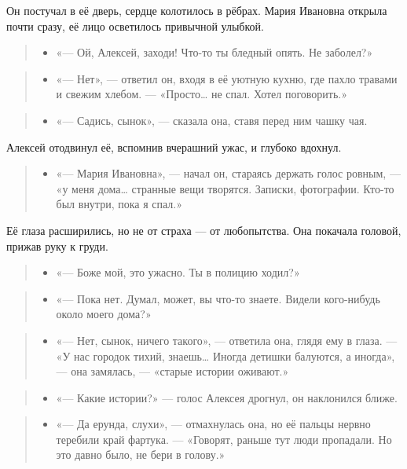 \documentclass[12pt,a4paper]{book}
\newenvironment{dialogue}{\begin{quote}\itshape\begin{itemize}\item[]}{\end{itemize}\end{quote}}
\begin{document}
Он постучал в её дверь, сердце колотилось в рёбрах. Мария Ивановна открыла почти сразу, её лицо осветилось привычной улыбкой.

\begin{dialogue}
«— Ой, Алексей, заходи! Что-то ты бледный опять. Не заболел?»
\end{dialogue}

\begin{dialogue}
«— Нет», — ответил он, входя в её уютную кухню, где пахло травами и свежим хлебом. — «Просто… не спал. Хотел поговорить.»
\end{dialogue}

\begin{dialogue}
«— Садись, сынок», — сказала она, ставя перед ним чашку чая.
\end{dialogue}

Алексей отодвинул её, вспомнив вчерашний ужас, и глубоко вдохнул.

\begin{dialogue}
«— Мария Ивановна», — начал он, стараясь держать голос ровным, — «у меня дома… странные вещи творятся. Записки, фотографии. Кто-то был внутри, пока я спал.»
\end{dialogue}

Её глаза расширились, но не от страха — от любопытства. Она покачала головой, прижав руку к груди.

\begin{dialogue}
«— Боже мой, это ужасно. Ты в полицию ходил?»
\end{dialogue}

\begin{dialogue}
«— Пока нет. Думал, может, вы что-то знаете. Видели кого-нибудь около моего дома?»
\end{dialogue}

\begin{dialogue}
«— Нет, сынок, ничего такого», — ответила она, глядя ему в глаза. — «У нас городок тихий, знаешь… Иногда детишки балуются, а иногда», — она замялась, — «старые истории оживают.»
\end{dialogue}

\begin{dialogue}
«— Какие истории?» — голос Алексея дрогнул, он наклонился ближе.
\end{dialogue}

\begin{dialogue}
«— Да ерунда, слухи», — отмахнулась она, но её пальцы нервно теребили край фартука. — «Говорят, раньше тут люди пропадали. Но это давно было, не бери в голову.»
\end{dialogue}
\end{document}
